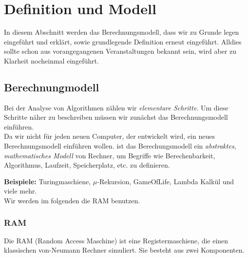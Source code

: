 \chapter{Definition und Modell}

In diesem Abschnitt werden das Berechnungsmodell, dass wir zu Grunde legen eingeführt und erklärt, sowie grundlegende Definition erneut eingeführt. Alldies sollte schon aus vorangegangenen Veranstaltungen bekannt sein, wird aber zu Klarheit nocheinmal eingeführt.

\section{Berechnungmodell}

Bei der Analyse von Algorithmen zählen wir \emph{elementare Schritte}. Um diese Schritte näher zu beschreiben müssen wir zunächst das Berechnungsmodell einführen.\\
Da wir nicht für jeden neuen Computer, der entwickelt wird, ein neues Berechnungsmodell einführen wollen. ist das Berechungsmodell ein \emph{abstraktes, mathematisches Modell} von Rechner, um Begriffe wie Berechenbarkeit, Algorithmus, Laufzeit, Speicherplatz, etc. zu definieren.

\textbf{Beispiele:} Turingmaschiene, $\mu$-Rekursion, GameOfLife, Lambda Kalkül und viele mehr.\\

Wir werden im folgenden die RAM benutzen.

\subsection{RAM}

Die RAM (Random Access Maschine) ist eine Registermaschiene, die einen klassischen von-Neumann Rechner simuliert. Sie besteht aus zwei Komponenten.

